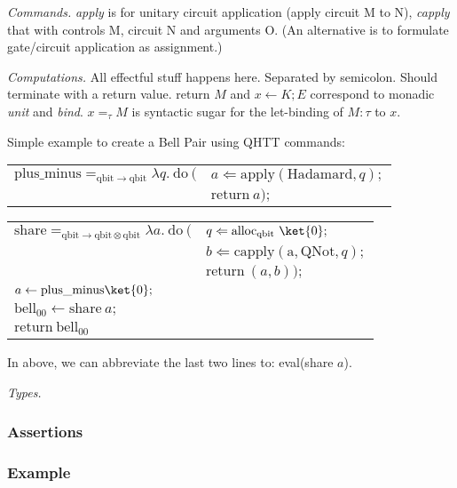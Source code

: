 \documentclass[acmsmall,nonacm]{acmart}\settopmatter{printfolios=true,printccs=false,printacmref=false}
\begin{document}
\textit{Commands.} \textit{apply} is for unitary circuit application (apply circuit M to N), \textit{capply} that with controls M, circuit N and arguments O. (An alternative is to formulate gate/circuit application as assignment.)

\textit{Computations.} All effectful stuff happens here. Separated by semicolon. Should terminate with a return value. return $M$ and $x \gets K; E$ correspond to monadic \textit{unit} and \textit{bind}. $x =_\tau M$ is syntactic sugar for the let-binding of $M:\tau$ to $x$.

Simple example to create a Bell Pair using QHTT commands:

\begin{center}
\begingroup
\setlength{\tabcolsep}{0pt}
\begin{tabular}{ll}

	$\mathrm{plus\_minus} =_{\mathrm{qbit} \to \mathrm{qbit}} \lambda q.\ \mathrm{do}\ ($&$a \Leftarrow \mathrm{apply}(\mathrm{Hadamard}, q);$\\
																																	&$\mathrm{return}\ a);$\\
\end{tabular}

\begin{tabular}{ll}
	$\mathrm{share} =_{\mathrm{qbit} \to \mathrm{qbit} \otimes \mathrm{qbit}} \lambda a.\ \mathrm{do}\ ($&$q \Leftarrow \mathrm{alloc_{qbit}}\ \ket{0};$\\
		&$b \Leftarrow \mathrm{capply}(\mathrm{a, QNot}, q);$\\
		&$\mathrm{return}\ (a, b));$\\
	$a \gets \mathrm{plus\_minus} \ket{0};$ & \\
	$\mathrm{bell_{00}} \gets \mathrm{share}\ a;$ & \\
	$\mathrm{return}\ \mathrm{bell_{00}}$&
\end{tabular}
\endgroup
\end{center}

In above, we can abbreviate the last two lines to: eval(share $a$).

\textit{Types.}

\subsubsection{Assertions}

\subsubsection{Example}
\end{document}
